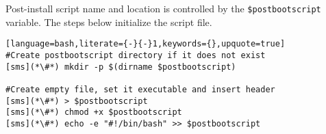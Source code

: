 
Post-install script name and location is controlled by the \texttt{\$postbootscript}
variable. The steps below initialize the script file.

\begin{lstlisting}[language=bash,literate={-}{-}1,keywords={},upquote=true]
#Create postbootscript directory if it does not exist
[sms](*\#*) mkdir -p $(dirname $postbootscript)

#Create empty file, set it executable and insert header
[sms](*\#*) > $postbootscript
[sms](*\#*) chmod +x $postbootscript
[sms](*\#*) echo -e "#!/bin/bash" >> $postbootscript
\end{lstlisting}

